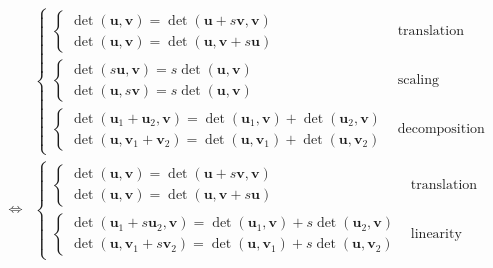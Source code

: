 \documentclass[
]{book}
\theoremstyle{definition}
\theoremstyle{definition}
\theoremstyle{definition}
\theoremstyle{definition}
\theoremstyle{remark}
\begin{document}
\[
\begin{aligned}
 & \begin{cases}
\begin{cases}
\det\left(\boldsymbol{u},\boldsymbol{v}\right)=\det\left(\boldsymbol{u}+s\boldsymbol{v},\boldsymbol{v}\right)\\
\det\left(\boldsymbol{u},\boldsymbol{v}\right)=\det\left(\boldsymbol{u},\boldsymbol{v}+s\boldsymbol{u}\right)
\end{cases} & \text{translation invariance}\\
\begin{cases}
\det\left(s\boldsymbol{u},\boldsymbol{v}\right)=s\det\left(\boldsymbol{u},\boldsymbol{v}\right)\\
\det\left(\boldsymbol{u},s\boldsymbol{v}\right)=s\det\left(\boldsymbol{u},\boldsymbol{v}\right)
\end{cases} & \text{scaling}\\
\begin{cases}
\det\left(\boldsymbol{u}_{{\scriptscriptstyle 1}}+\boldsymbol{u}_{{\scriptscriptstyle 2}},\boldsymbol{v}\right)=\det\left(\boldsymbol{u}_{{\scriptscriptstyle 1}},\boldsymbol{v}\right)+\det\left(\boldsymbol{u}_{{\scriptscriptstyle 2}},\boldsymbol{v}\right)\\
\det\left(\boldsymbol{u},\boldsymbol{v}_{{\scriptscriptstyle 1}}+\boldsymbol{v}_{{\scriptscriptstyle 2}}\right)=\det\left(\boldsymbol{u},\boldsymbol{v}_{{\scriptscriptstyle 1}}\right)+\det\left(\boldsymbol{u},\boldsymbol{v}_{{\scriptscriptstyle 2}}\right)
\end{cases} & \text{decomposition}
\end{cases}\\
\Leftrightarrow & \begin{cases}
\begin{cases}
\det\left(\boldsymbol{u},\boldsymbol{v}\right)=\det\left(\boldsymbol{u}+s\boldsymbol{v},\boldsymbol{v}\right)\\
\det\left(\boldsymbol{u},\boldsymbol{v}\right)=\det\left(\boldsymbol{u},\boldsymbol{v}+s\boldsymbol{u}\right)
\end{cases} & \text{translation invariance}\\
\begin{cases}
\det\left(\boldsymbol{u}_{{\scriptscriptstyle 1}}+s\boldsymbol{u}_{{\scriptscriptstyle 2}},\boldsymbol{v}\right)=\det\left(\boldsymbol{u}_{{\scriptscriptstyle 1}},\boldsymbol{v}\right)+s\det\left(\boldsymbol{u}_{{\scriptscriptstyle 2}},\boldsymbol{v}\right)\\
\det\left(\boldsymbol{u},\boldsymbol{v}_{{\scriptscriptstyle 1}}+s\boldsymbol{v}_{{\scriptscriptstyle 2}}\right)=\det\left(\boldsymbol{u},\boldsymbol{v}_{{\scriptscriptstyle 1}}\right)+s\det\left(\boldsymbol{u},\boldsymbol{v}_{{\scriptscriptstyle 2}}\right)
\end{cases} & \text{linearity}
\end{cases}
\end{aligned}
\]
\end{document}
